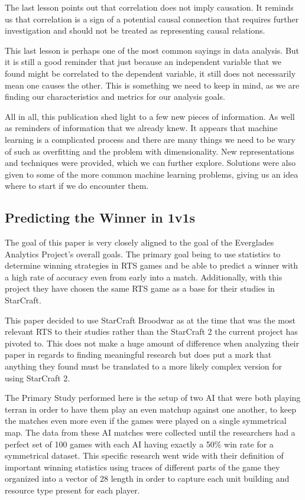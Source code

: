 \documentclass[a4paper,12pt]{report}
\begin{document}
The last lesson points out that correlation does not imply causation. It reminds us that correlation is a sign of a potential causal connection that requires further investigation and should not be treated as representing causal relations.

This last lesson is perhaps one of the most common sayings in data analysis. But it is still a good reminder that just because an independent variable that we found might be correlated to the dependent variable, it still does not necessarily mean one causes the other. This is something we need to keep in mind, as we are finding our characteristics and metrics for our analysis goals.

All in all, this publication shed light to a few new pieces of information. As well as reminders of information that we already knew. It appears that machine learning is a complicated process and there are many things we need to be wary of such as overfitting and the problem with dimensionality. New representations and techniques were provided, which we can further explore. Solutions were also given to some of the more common machine learning problems, giving us an idea where to start if we do encounter them.

\subsection{Predicting the Winner in 1v1s}

The goal of this paper is very closely aligned to the goal of the Everglades Analytics Project’s overall goals. The primary goal being to use statistics to determine winning strategies in RTS games and be able to predict a winner with a high rate of accuracy even from early into a match. Additionally, with this project  they have chosen the same RTS game as a base for their studies in StarCraft.

This paper decided to use StarCraft Broodwar as at the time that was the most relevant RTS to their studies rather than the StarCraft 2 the current project has pivoted to. This does not make a huge amount of difference when analyzing their paper in regards to finding meaningful research but does put a mark that anything they found must be translated to a more likely complex version for using StarCraft 2.

The Primary Study performed here is the setup of two AI that were both playing terran in order to have them play an even matchup against one another, to keep the matches even more even if the games were played on a single symmetrical map. The data from these AI matches were collected until the researchers had a perfect set of 100 games with each AI having exactly a 50\% win rate for a symmetrical dataset. This specific research went wide with their definition of important winning statistics using traces of different parts of the game they organized into a vector of 28 length in order to capture each unit building and resource type present for each player. 
\end{document}
